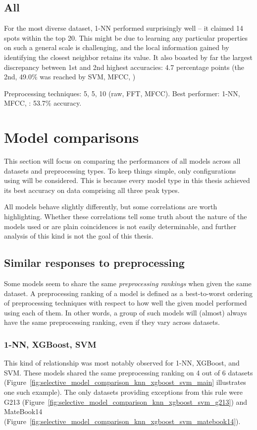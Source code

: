 \documentclass[../main.tex]{subfiles}
\begin{document}
%
\subsection{All}
For the most diverse dataset, 1-NN  performed surprisingly well -- it claimed 14 spots within the top 20. 
This might be due to learning any particular properties on such a general scale is challenging, and the local information gained by identifying the closest neighbor retains its value. 
It also boasted by far the largest discrepancy between 1st and 2nd highest accuracies: 4.7 percentage points (the 2nd, 49.0\% was reached by SVM, MFCC, )

Preprocessing techniques: 5, 5, 10 (raw, FFT, MFCC).
Best performer: 1-NN, MFCC, : 53.7\% accuracy.

\section{Model comparisons}
\label{sec:results_model_comparison}
This section will focus on comparing the performances of all models across all datasets and preprocessing types. To keep things simple, only configurations using  will be considered. This is because every model type in this thesis achieved its best accuracy on data comprising all three peak types.

All models behave slightly differently, but some correlations are worth highlighting. Whether these correlations tell some truth about the nature of the models used or are plain coincidences is not easily determinable, and further analysis of this kind is not the goal of this thesis.

\subsection{Similar responses to preprocessing}
Some models seem to share the same \emph{preprocessing rankings} when given the same dataset. A preprocessing ranking of a model is defined as a best-to-worst ordering of preprocessing techniques with respect to how well the given model performed using each of them. In other words, a group of such models will (almost) always have the same preprocessing ranking, even if they vary across datasets.

\subsubsection{1-NN, XGBoost, SVM}
This kind of relationship was most notably observed for 1-NN, XGBoost, and SVM. These models shared the same preprocessing ranking on 4 out of 6 datasets (Figure~\ref{fig:selective_model_comparison_knn_xgboost_svm_main} illustrates one such example). The only datasets providing exceptions from this rule were G213 (Figure~\ref{fig:selective_model_comparison_knn_xgboost_svm_g213}) and MateBook14 (Figure~\ref{fig:selective_model_comparison_knn_xgboost_svm_matebook14}).
\end{document}
